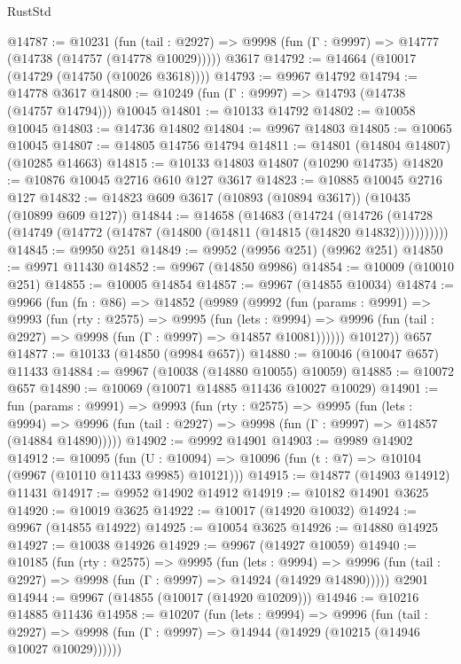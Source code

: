 \begin{lexlean}{RustStd}
\begin{coremodule}
@14787 := @10231
    (fun (tail : @2927) => @9998 (fun (Γ : @9997) => @14777 (@14738 (@14757 (@14778 @10029)))))
    @3617
@14792 := @14664 (@10017 (@14729 (@14750 (@10026 @3618))))
@14793 := @9967 @14792
@14794 := @14778 @3617
@14800 := @10249 (fun (Γ : @9997) => @14793 (@14738 (@14757 @14794))) @10045
@14801 := @10133 @14792
@14802 := @10058 @10045
@14803 := @14736 @14802
@14804 := @9967 @14803
@14805 := @10065 @10045
@14807 := @14805 @14756 @14794
@14811 := @14801 (@14804 @14807) (@10285 @14663)
@14815 := @10133 @14803 @14807 (@10290 @14735)
@14820 := @10876 @10045 @2716 @610 @127 @3617
@14823 := @10885 @10045 @2716 @127
@14832 := @14823 @609 @3617 (@10893 (@10894 @3617)) (@10435 (@10899 @609 @127))
@14844 := @14658
    (@14683
      (@14724
        (@14726 (@14728 (@14749 (@14772 (@14787 (@14800 (@14811 (@14815 (@14820 @14832)))))))))))
@14845 := @9950 @251
@14849 := @9952 (@9956 @251) (@9962 @251)
@14850 := @9971 @11430
@14852 := @9967 (@14850 @9986)
@14854 := @10009 (@10010 @251)
@14855 := @10005 @14854
@14857 := @9967 (@14855 @10034)
@14874 := @9966
    (fun (fn : @86) =>
    @14852
      (@9989
        (@9992
          (fun (params : @9991) =>
          @9993
            (fun (rty : @2575) =>
            @9995
              (fun (lets : @9994) =>
              @9996 (fun (tail : @2927) => @9998 (fun (Γ : @9997) => @14857 @10081))))))
        @10127))
    @657
@14877 := @10133 (@14850 (@9984 @657))
@14880 := @10046 (@10047 @657) @11433
@14884 := @9967 (@10038 (@14880 @10055) @10059)
@14885 := @10072 @657
@14890 := @10069 (@10071 @14885 @11436 @10027 @10029)
@14901 := fun (params : @9991) =>
  @9993
    (fun (rty : @2575) =>
    @9995
      (fun (lets : @9994) =>
      @9996 (fun (tail : @2927) => @9998 (fun (Γ : @9997) => @14857 (@14884 @14890)))))
@14902 := @9992 @14901
@14903 := @9989 @14902
@14912 := @10095
    (fun (U : @10094) => @10096 (fun (t : @7) => @10104 (@9967 (@10110 @11433 @9985) @10121)))
@14915 := @14877 (@14903 @14912) @11431
@14917 := @9952 @14902 @14912
@14919 := @10182 @14901 @3625
@14920 := @10019 @3625
@14922 := @10017 (@14920 @10032)
@14924 := @9967 (@14855 @14922)
@14925 := @10054 @3625
@14926 := @14880 @14925
@14927 := @10038 @14926
@14929 := @9967 (@14927 @10059)
@14940 := @10185
    (fun (rty : @2575) =>
    @9995
      (fun (lets : @9994) =>
      @9996 (fun (tail : @2927) => @9998 (fun (Γ : @9997) => @14924 (@14929 @14890)))))
    @2901
@14944 := @9967 (@14855 (@10017 (@14920 @10209)))
@14946 := @10216 @14885 @11436
@14958 := @10207
    (fun (lets : @9994) =>
    @9996
      (fun (tail : @2927) =>
      @9998 (fun (Γ : @9997) => @14944 (@14929 (@10215 (@14946 @10027 @10029))))))

\end{coremodule}
\end{lexlean}
